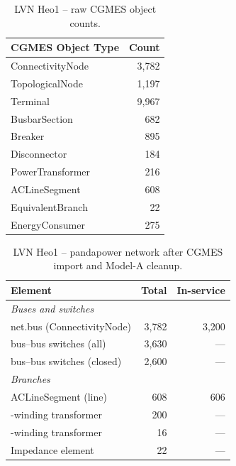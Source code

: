 \documentclass{article}
\begin{document}
\begin{table}[h]
\centering
\caption{LVN Heo1 -- raw CGMES object counts.}
\label{tab:lvn_cgmes}
\begin{tabular}{lr}
\toprule
CGMES Object Type & Count \\
\midrule
ConnectivityNode  & 3{,}782 \\
TopologicalNode   & 1{,}197 \\
Terminal          & 9{,}967 \\
BusbarSection     & 682 \\
Breaker           & 895 \\
Disconnector      & 184 \\
PowerTransformer  & 216 \\
ACLineSegment     & 608 \\
EquivalentBranch  & 22 \\
EnergyConsumer    & 275 \\
\bottomrule
\end{tabular}
\end{table}

\begin{table}[h]
\centering
\caption{LVN Heo1 -- pandapower network after CGMES import and Model-A
  cleanup.}
\label{tab:lvn_pandapower}
\setlength{\tabcolsep}{5pt}
\begin{tabular}{lrr}
\toprule
Element & Total & In-service \\
\midrule
\multicolumn{3}{l}{\textit{Buses and switches}} \\
\quad net.bus (ConnectivityNode)  & 3{,}782 & 3{,}200 \\
\quad bus--bus switches (all)     & 3{,}630 & --- \\
\quad bus--bus switches (closed)  & 2{,}600 & --- \\
\midrule
\multicolumn{3}{l}{\textit{Branches}} \\
\quad ACLineSegment (line)        & 608 & 606 \\
\quad 2-winding transformer       & 200 & --- \\
\quad 3-winding transformer       & 16  & --- \\
\quad Impedance element           & 22  & --- \\
\bottomrule
\end{tabular}
\end{table}
\end{document}
